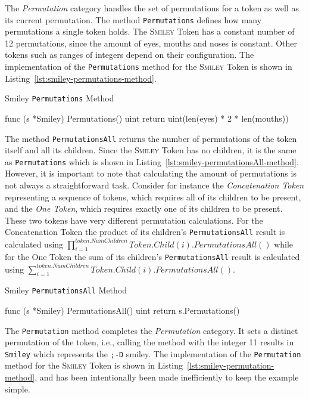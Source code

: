 The \textit{Permutation} category handles the set of permutations for a token as well as its current permutation. The method \texttt{Permutations} defines how many permutations a single token holds. The \textsc{Smiley} Token has a constant number of 12 permutations, since the amount of eyes, mouths and noses is constant. Other tokens such as ranges of integers depend on their configuration. The implementation of the \texttt{Permutations} method for the \textsc{Smiley} Token is shown in Listing~\ref{lst:smiley-permutations-method}.

\begin{listing}
\caption{Smiley \texttt{Permutations} Method}
\label{lst:smiley-permutations-method}
\begin{gocode}
func (s *Smiley) Permutations() uint {
	return uint(len(eyes) * 2 * len(mouths))
}
\end{gocode}
\end{listing}

The method \texttt{PermutationsAll} returns the number of permutations of the token itself and all its children. Since the \textsc{Smiley} Token has no children, it is the same as \texttt{Permutations} which is shown in Listing~\ref{lst:smiley-permutationsAll-method}. However, it is important to note that calculating the amount of permutations is not always a straightforward task. Consider for instance the \emph{Concatenation Token} representing a sequence of tokens, which requires all of its children to be present, and the \emph{One Token}, which requires exactly one of its children to be present. These two tokens have very different permutation calculations. For the Concatenation Token the product of its children's \texttt{PermutationsAll} result is calculated using $\prod_{i=1}^{token. NumChildren} Token.Child(i).PermutationsAll()$ while for the One Token the sum of its children's \texttt{PermutationsAll} result is calculated using $\sum_{i=1}^{token. NumChildren} Token.Child(i).PermutationsAll()$.

\begin{listing}
\caption{Smiley \texttt{PermutationsAll} Method}
\label{lst:smiley-permutationsAll-method}
\begin{gocode}
func (s *Smiley) PermutationsAll() uint {
	return s.Permutations()
}
\end{gocode}
\end{listing}

The \texttt{Permutation} method completes the \textit{Permutation} category. It sets a distinct permutation of the token, i.e., calling the method with the integer 11 results in \texttt{Smiley} which represents the \texttt{;-D} smiley. The implementation of the \texttt{Permutation} method for the \textsc{Smiley} Token is shown in Listing~\ref{lst:smiley-permutation-method}, and has been intentionally been made inefficiently to keep the example simple.

